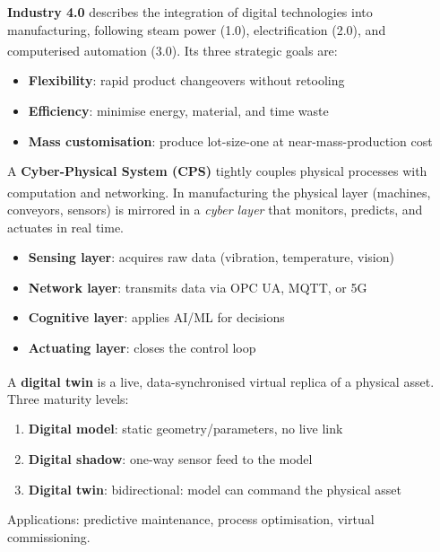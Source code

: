 \begin{tcbitemize}[ skin=sectionraster ]
    \tcbitem[title={The Fourth Industrial Revolution}, raster multicolumn=3]
    \textbf{Industry 4.0} describes the integration of digital technologies into manufacturing, following steam power (1.0), electrification (2.0), and computerised automation (3.0)\textsuperscript{\cite[][pp.~1--10]{dafflonChallengesApproachesCPS2021}}.
    Its three strategic goals are:
    \begin{itemize}
        \item \textbf{Flexibility}: rapid product changeovers without retooling
        \item \textbf{Efficiency}: minimise energy, material, and time waste
        \item \textbf{Mass customisation}: produce lot-size-one at near-mass-production cost
    \end{itemize}

    \tcbitem[title={Cyber-Physical Systems}, raster multicolumn=3]
    A \textbf{Cyber-Physical System (CPS)} tightly couples physical processes with computation and networking\textsuperscript{\cite[][pp.~3--8]{singhEmergenceCyberPhysical2021}}.
    In manufacturing the physical layer (machines, conveyors, sensors) is mirrored in a \emph{cyber layer} that monitors, predicts, and actuates in real time.
    \begin{itemize}
        \item \textbf{Sensing layer}: acquires raw data (vibration, temperature, vision)
        \item \textbf{Network layer}: transmits data via OPC UA, MQTT, or 5G
        \item \textbf{Cognitive layer}: applies AI/ML for decisions
        \item \textbf{Actuating layer}: closes the control loop
    \end{itemize}

    \tcbitem[title={Digital Twins}, raster multicolumn=3]
    A \textbf{digital twin} is a live, data-synchronised virtual replica of a physical asset\textsuperscript{\cite[][pp.~2405--2406]{bocewiczDigitalTwinManufacturing2021}}.
    Three maturity levels:
    \begin{enumerate}
        \item \textbf{Digital model}: static geometry/parameters, no live link
        \item \textbf{Digital shadow}: one-way sensor feed to the model
        \item \textbf{Digital twin}: bidirectional: model can command the physical asset
    \end{enumerate}
    Applications: predictive maintenance, process optimisation, virtual commissioning.


\end{tcbitemize}
